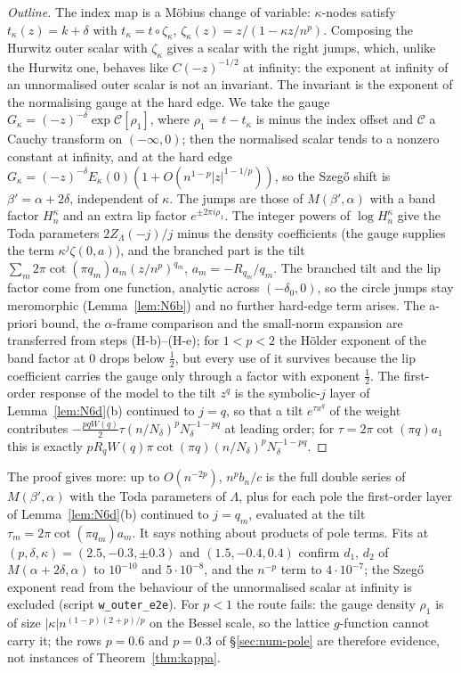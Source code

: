\begin{proof}[Outline]
The index map is a M\"obius change of variable: $\kappa$-nodes satisfy $t_\kappa(z)=k+\delta$ with $t_\kappa=t\circ\zeta_\kappa$,
$\zeta_\kappa(z)=z/(1-\kappa z/n^p)$. Composing the Hurwitz outer scalar with $\zeta_\kappa$ gives a scalar with the right jumps, which,
unlike the Hurwitz one, behaves like $C(-z)^{-1/2}$ at infinity: the exponent at infinity of an unnormalised outer scalar is not an
invariant. The invariant is the exponent of the normalising gauge at the hard edge. We take the gauge
$G_\kappa=(-z)^{-\delta}\exp\mathcal C[\rho_1]$, where $\rho_1=t-t_\kappa$ is minus the index offset and $\mathcal C$ a Cauchy transform on
$(-\infty,0)$; then the normalised scalar tends to a nonzero constant at infinity, and at the hard edge
$G_\kappa=(-z)^{-\delta}E_\kappa(0)(1+O(n^{1-p}|z|^{1-1/p}))$, so the Szeg\H{o} shift is $\beta'=\alpha+2\delta$, independent of $\kappa$.
The jumps are those of $M(\beta',\alpha)$ with a band factor $H_n^\kappa$ and an extra lip factor $e^{\pm2\pi i\rho_1}$. The integer powers of
$\log H_n^\kappa$ give the Toda parameters $2Z_\Lambda(-j)/j$ minus the density coefficients (the gauge supplies the term
$\kappa^j\zeta(0,a)$), and the branched part is the tilt $\sum_m2\pi\cot(\pi q_m)a_m(z/n^p)^{q_m}$, $a_m=-R_{q_m}/q_m$. The branched tilt
and the lip factor come from one function, analytic across $(-\delta_0,0)$, so the circle jumps stay meromorphic (Lemma~\ref{lem:N6b})
and no further hard-edge term arises. The a-priori bound, the $\alpha$-frame comparison and the small-norm expansion are transferred
from steps (H-b)--(H-e); for $1<p<2$ the H\"older exponent of the band factor at $0$ drops below $\frac12$, but every use of it
survives because the lip coefficient carries the gauge only through a factor with exponent $\frac12$. The first-order response of
the model to the tilt $z^{q}$ is the symbolic-$j$ layer of Lemma~\ref{lem:N6d}(b) continued to $j=q$, so that a tilt $e^{\tau x^q}$ of the
weight contributes $-\frac{pqW(q)}2\tau(n/N_\delta)^pN_\delta^{-1-pq}$ at leading order; for $\tau=2\pi\cot(\pi q)a_1$ this is exactly $pR_qW(q)\pi\cot(\pi q)(n/N_\delta)^pN_\delta^{-1-pq}$.
\end{proof}

The proof gives more: up to $O(n^{-2p})$, $n^pb_n/c$ is the full double series of $M(\beta',\alpha)$ with the Toda parameters of
$\Lambda$, plus for each pole the first-order layer of Lemma~\ref{lem:N6d}(b) continued to $j=q_m$, evaluated at the tilt
$\tau_m=2\pi\cot(\pi q_m)a_m$. It says nothing about products of pole terms. Fits at $(p,\delta,\kappa)=(2.5,-0.3,\pm0.3)$ and $(1.5,-0.4,0.4)$ confirm $d_1$, $d_2$ of $M(\alpha+2\delta,\alpha)$ to
$10^{-10}$ and $5\cdot10^{-8}$, and the $n^{-p}$ term to $4\cdot10^{-7}$; the Szeg\H{o} exponent read from the behaviour of the
unnormalised scalar at infinity is excluded (script \texttt{w\_outer\_e2e}). For $p<1$ the route
fails: the gauge density $\rho_1$ is of size $|\kappa|n^{(1-p)(2+p)/p}$ on the Bessel scale, so the lattice $g$-function cannot carry
it; the rows $p=0.6$ and $p=0.3$ of \S\ref{sec:num-pole} are therefore evidence, not instances of Theorem~\ref{thm:kappa}.
